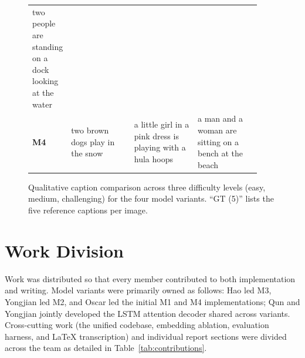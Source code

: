 \documentclass[10pt,twocolumn,letterpaper]{article}
\begin{document}
\begin{figure}[t]
\begin{tabular}{@{}>{\centering\arraybackslash}m{0.04\linewidth} >{\raggedright\arraybackslash}m{0.295\linewidth} >{\raggedright\arraybackslash}m{0.295\linewidth} >{\raggedright\arraybackslash}m{0.295\linewidth}@{}}
  two people are standing on a dock looking at the water \\
\textbf{M4} &
  two brown dogs play in the snow &
  a little girl in a pink dress is playing with a hula hoops &
  a man and a woman are sitting on a bench at the beach \\
\bottomrule
\end{tabular}
\caption{\footnotesize Qualitative caption comparison across three
difficulty levels (easy, medium, challenging) for the four model
variants.  ``GT (5)'' lists the five reference captions per image.}
\label{fig:qual}
\end{figure}

\vspace*{2in}

\newpage

\vspace*{2in}
\clearpage
\newpage

\section*{Work Division}

Work was distributed so that every member contributed to both
implementation and writing. Model variants were primarily owned as
follows: Hao led M3, Yongjian led M2, and Oscar led the initial M1
and M4 implementations; Qun and Yongjian jointly developed the LSTM
attention decoder shared across variants. Cross-cutting work (the
unified codebase, embedding ablation, evaluation harness, and
\LaTeX{} transcription) and individual report sections were divided
across the team as detailed in Table~\ref{tab:contributions}.
\end{document}
